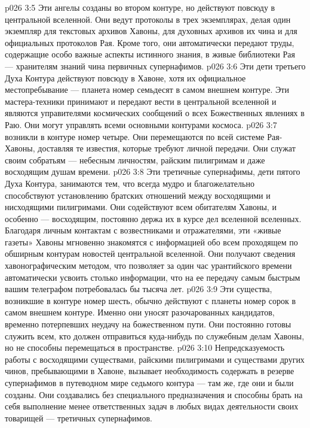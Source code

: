 \vs p026 3:5 \pc {}\bibnobreakspace {} Эти ангелы созданы во втором контуре, но действуют повсюду в центральной вселенной. Они ведут протоколы в трех экземплярах, делая один экземпляр для текстовых архивов Хавоны, для духовных архивов их чина и для официальных протоколов Рая. Кроме того, они автоматически передают труды, содержащие особо важные аспекты истинного знания, в живые библиотеки Рая --- хранителям знаний чина первичных супернафимов.
\vs p026 3:6 \pc {}\bibnobreakspace {} Эти дети третьего Духа Контура действуют повсюду в Хавоне, хотя их официальное местопребывание --- планета номер семьдесят в самом внешнем контуре. Эти мастера\hyp{}техники принимают и передают вести в центральной вселенной и являются управителями космических сообщений о всех Божественных явлениях в Раю. Они могут управлять всеми основными контурами космоса.
\vs p026 3:7 \pc {}\bibnobreakspace {} возникли в контуре номер четыре. Они перемещаются по всей системе Рая\hyp{}Хавоны, доставляя те известия, которые требуют личной передачи. Они служат своим собратьям --- небесным личностям, райским пилигримам и даже восходящим душам времени.
\vs p026 3:8 \pc {}\bibnobreakspace {} Эти третичные супернафимы, дети пятого Духа Контура, занимаются тем, что всегда мудро и благожелательно способствуют установлению братских отношений между восходящими и нисходящими пилигримами. Они содействуют всем обитателям Хавоны, и особенно --- восходящим, постоянно держа их в курсе дел вселенной вселенных. Благодаря личным контактам с возвестниками и отражателями, эти «живые газеты» Хавоны мгновенно знакомятся с информацией обо всем проходящем по обширным контурам новостей центральной вселенной. Они получают сведения хавонографическим методом, что позволяет за один час урантийского времени автоматически усвоить столько информации, что на ее передачу самым быстрым вашим телеграфом потребовалась бы тысяча лет.
\vs p026 3:9 \pc {}\bibnobreakspace {} Эти существа, возникшие в контуре номер шесть, обычно действуют с планеты номер сорок в самом внешнем контуре. Именно они уносят разочарованных кандидатов, временно потерпевших неудачу на божественном пути. Они постоянно готовы служить всем, кто должен отправиться куда\hyp{}нибудь по служебным делам Хавоны, но не способны перемещаться в пространстве.
\vs p026 3:10 \pc {}\bibnobreakspace {} Непредсказуемость работы с восходящими существами, райскими пилигримами и существами других чинов, пребывающими в Хавоне, вызывает необходимость содержать в резерве супернафимов в путеводном мире седьмого контура --- там же, где они и были созданы. Они создавались без специального предназначения и способны брать на себя выполнение менее ответственных задач в любых видах деятельности своих товарищей --- третичных супернафимов.
